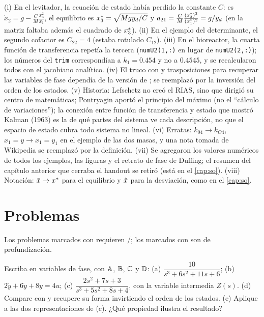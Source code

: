 \begin{profundiza}
(i) En el levitador, la ecuación de estado había perdido la constante $C$: es $\dot x_2=g-\frac CM\frac{x_3^2}{x_1}$, el equilibrio es $x^{*}_3=\sqrt{Mgy_d/C}$ y $a_{21}=\frac CM\frac{(x^{*}_3)^2}{(x^{*}_1)^2}=g/y_d$ (en la matriz faltaba además el cuadrado de $x^{*}_3$). (ii) En el ejemplo del determinante, el segundo cofactor es $C_{22}=4$ (estaba rotulado $C_{12}$). (iii) En el bioreactor, la cuarta función de transferencia repetía la tercera (\texttt{numU2(1,:)} en lugar de \texttt{numU2(2,:)}); los números del \texttt{trim} correspondían a $k_1=0.454$ y no a $0.4545$, y se recalcularon todos con el jacobiano analítico. (iv) El truco con  y trasposiciones para recuperar las variables de fase dependía de la versión de \matlab; se reemplazó por la inversión del orden de los estados. (v) Historia: Lefschetz no creó el RIAS, sino que dirigió su centro de matemáticas; Pontryagin aportó el principio del máximo (no el ``cálculo de variaciones''); la conexión entre función de transferencia y estado que mostró Kalman (1963) es la de qué partes del sistema ve cada descripción, no que el espacio de estado cubra todo sistema no lineal. (vi) Erratas: $k_{04}\to k_{O4}$, $x_1=y\to x_1=y_1$ en el ejemplo de las dos masas, y una nota tomada de Wikipedia se reemplazó por la definición. (vii) Se agregaron los valores numéricos de todos los ejemplos, las figuras y el retrato de fase de Duffing; el resumen del capítulo anterior que cerraba el handout se retiró (está en el \cref{cap:so}). (viii) Notación: $\bar x\to x^{*}$ para el equilibrio y $\hat{x}$ para la desviación, como en el \cref{cap:so}.
\end{profundiza}

\section{Problemas}
\label{sec:ee-problemas}

Los problemas marcados con \etiquetaM{} requieren \matlab/\simulink; los marcados con \etiquetaEstrella{} son de profundización.

\begin{problema}\label{prob:ee-fase}
Escriba en variables de fase, con $\mathbb{A}$, $\mathbb{B}$, $\mathbb{C}$ y $\mathbb{D}$: (a) $\dfrac{10}{s^3+6s^2+11s+6}$; (b) $2\ddot y+6\dot y+8y=4u$; (c) $\dfrac{2s^2+7s+3}{s^3+5s^2+8s+4}$, con la variable intermedia $Z(s)$. (d) \etiquetaM{} Compare con  y recupere su forma invirtiendo el orden de los estados. (e) \etiquetaM{} Aplique  a las dos representaciones de (c). ¿Qué propiedad ilustra el resultado?
\end{problema}

